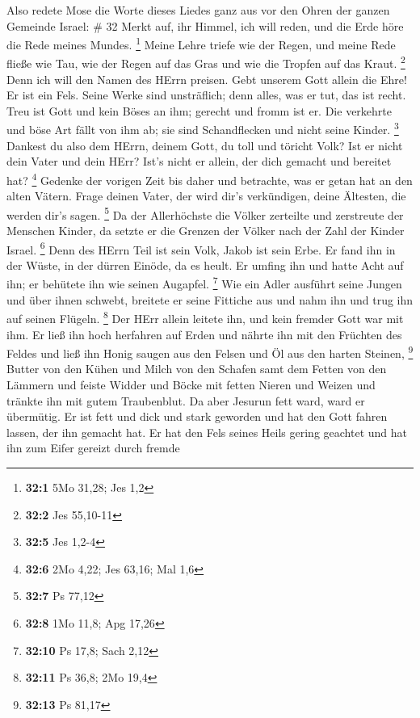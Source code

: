  Also redete Mose die Worte dieses Liedes ganz aus vor den
Ohren der ganzen Gemeinde Israel: \# 32  Merkt auf, ihr
Himmel, ich will reden, und die Erde höre die Rede meines Mundes.
\footnote{\textbf{32:1} 5Mo 31,28; Jes 1,2}  Meine Lehre
triefe wie der Regen, und meine Rede fließe wie Tau, wie der Regen auf
das Gras und wie die Tropfen auf das Kraut. \footnote{\textbf{32:2} Jes
  55,10-11}  Denn ich will den Namen des HErrn preisen. Gebt
unserem Gott allein die Ehre!  Er ist ein Fels. Seine Werke
sind unsträflich; denn alles, was er tut, das ist recht. Treu ist Gott
und kein Böses an ihm; gerecht und fromm ist er.  Die
verkehrte und böse Art fällt von ihm ab; sie sind Schandflecken und
nicht seine Kinder. \footnote{\textbf{32:5} Jes 1,2-4} 
Dankest du also dem HErrn, deinem Gott, du toll und töricht Volk? Ist er
nicht dein Vater und dein HErr? Ist's nicht er allein, der dich gemacht
und bereitet hat? \footnote{\textbf{32:6} 2Mo 4,22; Jes 63,16; Mal 1,6}
 Gedenke der vorigen Zeit bis daher und betrachte, was er
getan hat an den alten Vätern. Frage deinen Vater, der wird dir's
verkündigen, deine Ältesten, die werden dir's sagen. \footnote{\textbf{32:7}
  Ps 77,12}  Da der Allerhöchste die Völker zerteilte und
zerstreute der Menschen Kinder, da setzte er die Grenzen der Völker nach
der Zahl der Kinder Israel. \footnote{\textbf{32:8} 1Mo 11,8; Apg 17,26}
 Denn des HErrn Teil ist sein Volk, Jakob ist sein Erbe.
 Er fand ihn in der Wüste, in der dürren Einöde, da es
heult. Er umfing ihn und hatte Acht auf ihn; er behütete ihn wie seinen
Augapfel. \footnote{\textbf{32:10} Ps 17,8; Sach 2,12}  Wie
ein Adler ausführt seine Jungen und über ihnen schwebt, breitete er
seine Fittiche aus und nahm ihn und trug ihn auf seinen Flügeln.
\footnote{\textbf{32:11} Ps 36,8; 2Mo 19,4}  Der HErr
allein leitete ihn, und kein fremder Gott war mit ihm.  Er
ließ ihn hoch herfahren auf Erden und nährte ihn mit den Früchten des
Feldes und ließ ihn Honig saugen aus den Felsen und Öl aus den harten
Steinen, \footnote{\textbf{32:13} Ps 81,17}  Butter von den
Kühen und Milch von den Schafen samt dem Fetten von den Lämmern und
feiste Widder und Böcke mit fetten Nieren und Weizen und tränkte ihn mit
gutem Traubenblut.  Da aber Jesurun fett ward, ward er
übermütig. Er ist fett und dick und stark geworden und hat den Gott
fahren lassen, der ihn gemacht hat. Er hat den Fels seines Heils gering
geachtet  und hat ihn zum Eifer gereizt durch fremde
